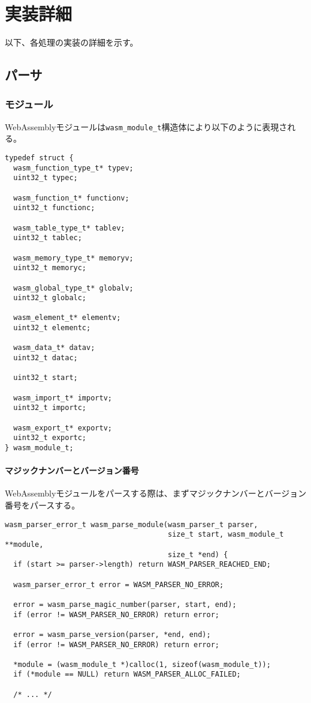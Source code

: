 \chapter{実装詳細}

以下、各処理の実装の詳細を示す。

\section{パーサ}

\subsection{モジュール}

WebAssemblyモジュールは\verb|wasm_module_t|構造体により以下のように表現される。

\begin{lstlisting}[caption=モジュールの構造体定義,label=lst:wasm_module_t]
typedef struct {
  wasm_function_type_t* typev;
  uint32_t typec;

  wasm_function_t* functionv;
  uint32_t functionc;

  wasm_table_type_t* tablev;
  uint32_t tablec;

  wasm_memory_type_t* memoryv;
  uint32_t memoryc;

  wasm_global_type_t* globalv;
  uint32_t globalc;

  wasm_element_t* elementv;
  uint32_t elementc;

  wasm_data_t* datav;
  uint32_t datac;

  uint32_t start;

  wasm_import_t* importv;
  uint32_t importc;

  wasm_export_t* exportv;
  uint32_t exportc;
} wasm_module_t;
\end{lstlisting}

\subsubsection{マジックナンバーとバージョン番号}

WebAssemblyモジュールをパースする際は、まずマジックナンバーとバージョン番号をパースする。

\begin{lstlisting}[caption=モジュールのパース,label=lst:parse_module_numbers]
wasm_parser_error_t wasm_parse_module(wasm_parser_t parser,
                                      size_t start, wasm_module_t **module,
                                      size_t *end) {
  if (start >= parser->length) return WASM_PARSER_REACHED_END;

  wasm_parser_error_t error = WASM_PARSER_NO_ERROR;

  error = wasm_parse_magic_number(parser, start, end);
  if (error != WASM_PARSER_NO_ERROR) return error;

  error = wasm_parse_version(parser, *end, end);
  if (error != WASM_PARSER_NO_ERROR) return error;

  *module = (wasm_module_t *)calloc(1, sizeof(wasm_module_t));
  if (*module == NULL) return WASM_PARSER_ALLOC_FAILED;

  /* ... */
\end{lstlisting}

